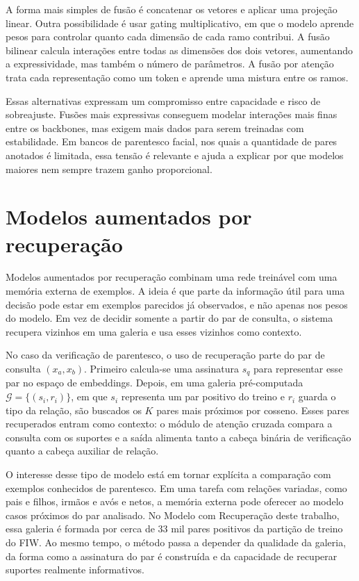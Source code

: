 A forma mais simples de fusão é concatenar os vetores e aplicar uma projeção linear. Outra possibilidade é usar gating multiplicativo, em que o modelo aprende pesos para controlar quanto cada dimensão de cada ramo contribui. A fusão bilinear calcula interações entre todas as dimensões dos dois vetores, aumentando a expressividade, mas também o número de parâmetros. A fusão por atenção trata cada representação como um token e aprende uma mistura entre os ramos.

Essas alternativas expressam um compromisso entre capacidade e risco de sobreajuste. Fusões mais expressivas conseguem modelar interações mais finas entre os backbones, mas exigem mais dados para serem treinadas com estabilidade. Em bancos de parentesco facial, nos quais a quantidade de pares anotados é limitada, essa tensão é relevante e ajuda a explicar por que modelos maiores nem sempre trazem ganho proporcional.

\section{Modelos aumentados por recuperação}

Modelos aumentados por recuperação combinam uma rede treinável com uma memória externa de exemplos. A ideia é que parte da informação útil para uma decisão pode estar em exemplos parecidos já observados, e não apenas nos pesos do modelo. Em vez de decidir somente a partir do par de consulta, o sistema recupera vizinhos em uma galeria e usa esses vizinhos como contexto.

No caso da verificação de parentesco, o uso de recuperação parte do par de consulta $(x_a, x_b)$. Primeiro calcula-se uma assinatura $s_q$ para representar esse par no espaço de embeddings. Depois, em uma galeria pré-computada $\mathcal{G} = \{(s_i, r_i)\}$, em que $s_i$ representa um par positivo do treino e $r_i$ guarda o tipo da relação, são buscados os $K$ pares mais próximos por cosseno. Esses pares recuperados entram como contexto: o módulo de atenção cruzada compara a consulta com os suportes e a saída alimenta tanto a cabeça binária de verificação quanto a cabeça auxiliar de relação.

O interesse desse tipo de modelo está em tornar explícita a comparação com exemplos conhecidos de parentesco. Em uma tarefa com relações variadas, como pais e filhos, irmãos e avós e netos, a memória externa pode oferecer ao modelo casos próximos do par analisado. No Modelo com Recuperação deste trabalho, essa galeria é formada por cerca de 33 mil pares positivos da partição de treino do FIW. Ao mesmo tempo, o método passa a depender da qualidade da galeria, da forma como a assinatura do par é construída e da capacidade de recuperar suportes realmente informativos.


